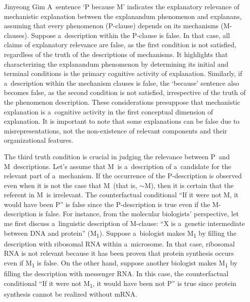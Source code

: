 \begin{artengenv}{Jinyeong Gim}
A~sentence ‘P because M' indicates the explanatory relevance of mechanistic explanation between the explanandum phenomenon and explanans, assuming that every phenomenon (P-clause) depends on its mechanisms (M-clauses). Suppose a~description within the P-clause is false. In that case, all claims of explanatory relevance are false, as the first condition is not satisfied, regardless of the truth of the descriptions of mechanisms. It highlights that characterizing the explanandum phenomenon by determining its initial and terminal conditions is the primary cognitive activity of explanation. Similarly, if a~description within the mechanism clauses is false, the ‘because' sentence also becomes false, as the second condition is not satisfied, irrespective of the truth of the phenomenon description. These considerations presuppose that mechanistic explanation is a~cognitive activity in the first conceptual dimension of explanation. It is important to note that some explanations can be false due to misrepresentations, not the non-existence of relevant components and their organizational features.

The third truth condition is crucial in judging the relevance between P~and M~descriptions. Let's assume that M~is a~description of a~candidate for the relevant part of a~mechanism. If the occurrence of the P-description is observed even when it is not the case that M~(that is, $\sim$M), then it is certain that the referent in M~is irrelevant. The counterfactual conditional ``If it were not M, it would have been P'' is false since the P-description is true even if the M-description is false. For instance, from the molecular biologists' perspective, let me first discuss a~linguistic description of M-clause: ``X is a~genetic intermediate between DNA and protein'' (M\textsubscript{1}). Suppose a~biologist makes M\textsubscript{1} by filling the description with ribosomal RNA within a~microsome. In that case, ribosomal RNA is not relevant because it has been proven that protein synthesis occurs even if M\textsubscript{1} is false. On the other hand, suppose another biologist makes M\textsubscript{1} by filling the description with messenger RNA. In this case, the counterfactual conditional ``If it were not M\textsubscript{1}, it would have been not P'' is true since protein synthesis cannot be realized without mRNA.


\end{artengenv}
